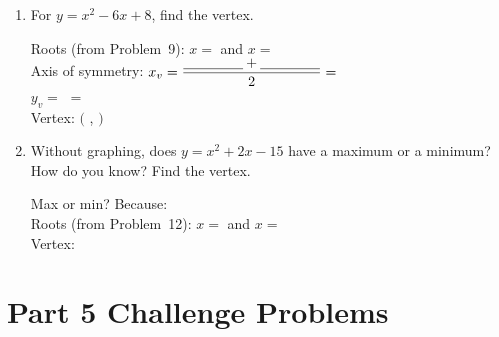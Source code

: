 \documentclass[12pt]{article}
\newcommand{\blank}[1][4cm]{\underline{\hspace{#1}}}
\begin{document}
\begin{enumerate}[leftmargin=*, label=\textbf{\arabic*.}, resume]

\item For $y = x^2 - 6x + 8$, find the vertex.

  \begin{workbox}
  Roots (from Problem~9): $x = $ \blank[1.5cm] and $x = $ \blank[1.5cm] \\[10pt]
  Axis of symmetry: $x_v = \dfrac{\blank[1.5cm] + \blank[1.5cm]}{2} = $ \blank[1.5cm] \\[10pt]
  $y_v = $ \blank[8cm] $= $ \blank[1.5cm] \\[10pt]
  Vertex: $\bigl($ \blank[1cm] , \blank[1cm] $\bigr)$
  \end{workbox}

\vspace{8pt}
\item Without graphing, does $y = x^2 + 2x - 15$ have a maximum or a minimum?
  How do you know?  Find the vertex.

  \begin{workbox}
  Max or min? \blank[3cm] \quad Because: \blank[6cm] \\[10pt]
  Roots (from Problem~12): $x = $ \blank[1.5cm] and $x = $ \blank[1.5cm] \\[10pt]
  Vertex: \blank[8cm]
  \end{workbox}

\end{enumerate}

\section*{Part 5 \quad Challenge Problems}
\end{document}
